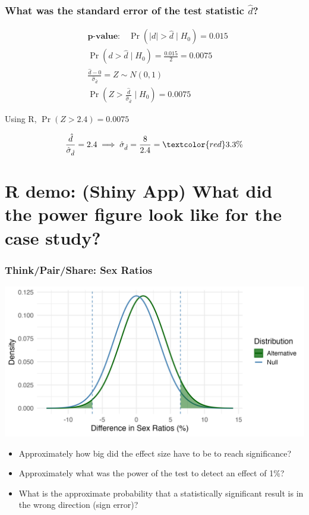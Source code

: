 \documentclass[slidestop,compress,mathserif]{beamer}
\begin{document}
\begin{frame}
	\frametitle{What was the standard error of the test statistic $\hat{d}$?}

	\vspace{0.5em}
	\begin{align*}
	&\textbf{p-value:}\quad \Pr(|d| > \hat{d}\mid H_0) = 0.015 \\
	&\Pr(d > \hat{d}\mid H_0) = \frac{0.015}{2} = 0.0075 \\
	&\frac{\hat{d} - 0}{\hat{\sigma}_{\hat{d}}} = Z \sim N(0,1) \\
	&\Pr\left(Z > \frac{\hat{d}}{\hat{\sigma}_{\hat{d}}} \mid H_0\right) = 0.0075
	\end{align*}

	Using R, $\Pr(Z > 2.4) = 0.0075$

	\begin{align*}
	\frac{\hat{d}}{\hat{\sigma}_{\hat{d}}} = 2.4 \implies \hat{\sigma}_{\hat{d}} = \frac{8}{2.4} = \textcolor{red}{3.3\%}
	\end{align*}

\end{frame}


\section{R demo: (Shiny App) What did the power figure look like for the case study?}

\begin{frame}
	\frametitle{Think/Pair/Share: Sex Ratios}
	\begin{center}
		\includegraphics[height=0.5\textheight]{figures/whatif_sexratio.png}
	\end{center}
	\small{
	\begin{itemize}
		\item Approximately how big did the effect size have to be to reach significance?
		\item Approximately what was the power of the test to detect an effect of 1\%?
		\item What is the approximate probability that a statistically significant result is in the wrong direction (sign error)?
	\end{itemize}
	}
\end{frame}
\end{document}
